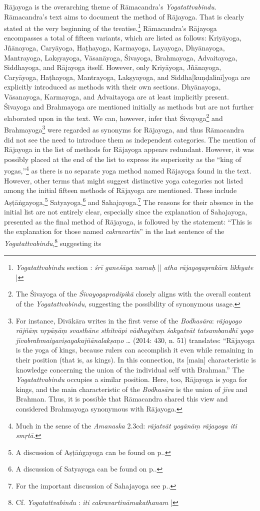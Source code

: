 Rājayoga is the overarching theme of Rāmacandra's \emph{Yogatattvabindu}. Rāmacandra's text aims to document the method of Rājayoga. That is clearly stated at the very beginning of the treatise.\footnote{\emph{Yogatattvabindu} section : \textit{śrī ganeśāya namaḥ} || \textit{atha rājayogaprakāra likhyate} |} Rāmacandra's Rājayoga encompasses a total of fifteen variants, which are listed as follows: Kriyāyoga, Jñānayoga, Caryāyoga, Haṭhayoga, Karmayoga, Layayoga, Dhyānayoga, Mantrayoga, Lakṣyayoga, Vāsanāyoga, Śivayoga, Brahmayoga, Advaitayoga, Siddhayoga, and Rājayoga itself. However, only Kriyāyoga, Jñānayoga, Caryāyoga, Haṭhayoga, Mantrayoga, Lakṣyayoga, and Siddha[kuṇḍalinī]yoga are explicitly introduced as methods with their own sections. Dhyānayoga, Vāsanayoga, Karmayoga, and Advaitayoga are at least implicitly present. Śivayoga and Brahmayoga are mentioned initially as methods but are not further elaborated upon in the text. We can, however, infer that Śivayoga\footnote{The Śivayoga of the \textit{Śivayogapradīpikā} closely aligns with the overall content of the \textit{Yogatattvabindu}, suggesting the possibility of synonymous usage.} and Brahmayoga\footnote{For instance, Divākāra writes in the first verse of the \textit{Bodhasāra}: \textit{rājayogo rājñāṃ nṛpāṇāṃ svasthāne sthitvāpi vādhayituṃ śakyatvāt tatsambandhī yogo jīvabrahmaiyaviṣayakajñānalakṣaṇo} \ldots \citeauthor{birch2014} (2014: 430, n. 51) translates: ``Rājayoga is the yoga of kings, because rulers can accomplish it even while remaining in their position (that is, as kings). In this connection, its [main] characteristic is knowledge concerning the union of the individual self with Brahman.'' The \emph{Yogatattvabindu} occupies a similar position. Here, too, Rājayoga is yoga for kings, and the main characteristic of the \emph{Bodhasāra} is the union of \textit{jīva} and Brahman. Thus, it is possible that Rāmacandra shared this view and considered Brahmayoga synonymous with Rājayoga.} were regarded as synonyms for Rājayoga, and thus Rāmacandra did not see the need to introduce them as independent categories. The mention of Rājayoga in the list of methods for Rājayoga appears redundant. However, it was possibly placed at the end of the list to express its superiority as the ``king of yogas,''\footnote{Much in the sense of the \emph{Amanaska} 2.3cd: \textit{rājatvāt yogānāṃ rājayoga iti smṛtā}.} as there is no separate yoga method named Rājayoga found in the text. However, other terms that might suggest distinctive yoga categories not listed among the initial fifteen methods of Rājayoga are mentioned. These include Aṣṭāṅgayoga,\footnote{A discussion of Aṣṭāṅgayoga can be found on p.\pageref{ashtangayoga}.} Satyayoga,\footnote{A discussion of Satyayoga can be found on p.\pageref{satyayoga}.} and Sahajayoga.\footnote{For the important discussion of Sahajayoga see p.\pageref{sahajayoga}.} The reasons for their absence in the initial list are not entirely clear, especially since the explanation of Sahajayoga, presented as the final method of Rājayoga, is followed by the statement: ``This is the explanation for those named \textit{cakravartin}'' in the last sentence of the \textit{Yogatattvabindu},\footnote{Cf. \emph{Yogatattvabindu} : \textit{iti cakravartināmakathanam} |} suggesting its 